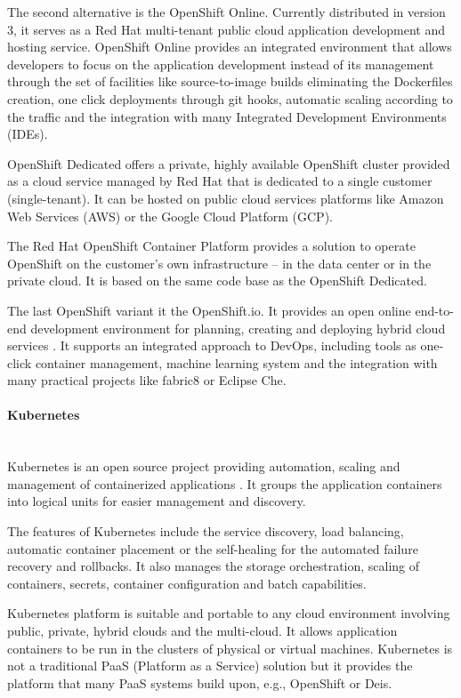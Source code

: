 \documentclass[oneside,
  digital, %
  table,   %
  lof,     %
  lot,     %
]{fithesis3}
\newcommand{\newlinepar}[1]{\paragraph{#1}\needspace{3\baselineskip}\mbox{}\\}
\begin{document}
The second alternative is the OpenShift Online. Currently distributed in version 3, it serves as a Red Hat multi-tenant public cloud application development and hosting service. OpenShift Online provides an integrated environment that allows developers to focus on the application development instead of its management through the set of facilities like source-to-image builds eliminating the Dockerfiles creation, one click deployments through git hooks, automatic scaling according to the traffic and the integration with many Integrated Development Environments (IDEs).

OpenShift Dedicated offers a private, highly available OpenShift cluster provided as a cloud service managed by Red Hat that is dedicated to a single customer (single-tenant). It can be hosted on public cloud services platforms like Amazon Web Services (AWS) or the Google Cloud Platform (GCP).

The Red Hat OpenShift Container Platform provides a solution to operate OpenShift on the customer's own infrastructure -- in the data center or in the private cloud. It is based on the same code base as the OpenShift Dedicated.

The last OpenShift variant it the OpenShift.io. It provides an open online end-to-end development environment for planning, creating and deploying hybrid cloud services \cite{openshift_io}. It supports an integrated approach to DevOps, including tools as one-click container management, machine learning system and the integration with many practical projects like fabric8 or Eclipse Che.

\newlinepar{Kubernetes}

Kubernetes is an open source project providing automation, scaling and management of containerized applications \cite{kubernetes}. It groups the application containers into logical units for easier management and discovery.

The features of Kubernetes include the service discovery, load balancing, automatic container placement or the self-healing for the automated failure recovery and rollbacks. It also manages the storage orchestration, scaling of containers, secrets, container configuration and batch capabilities.

Kubernetes platform is suitable and portable to any cloud environment involving public, private, hybrid clouds and the multi-cloud. It allows application containers to be run in the clusters of physical or virtual machines. Kubernetes is not a traditional PaaS (Platform as a Service) solution but it provides the platform that many PaaS systems build upon, e.g., OpenShift or Deis.
\end{document}
